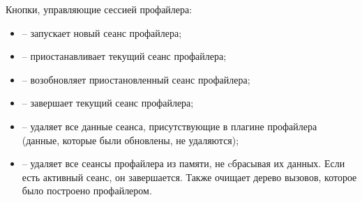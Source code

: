 Кнопки, управляющие сессией профайлера:
\begin{itemize}
\item {} -- запускает новый сеанс профайлера;
\item {} -- приостанавливает текущий сеанс профайлера;
\item {} -- возобновляет приостановленный сеанс профайлера;
\item {} -- завершает текущий сеанс профайлера;
\item {} -- удаляет все данные сеанса, присутствующие в плагине профайлера (данные, которые были обновлены, не удаляются);
\item {} -- удаляет все сеансы профайлера из памяти, не cбрасывая их данных. Если есть активный сеанс, он завершается. Также очищает дерево вызовов, которое было построено профайлером.
\end{itemize}

